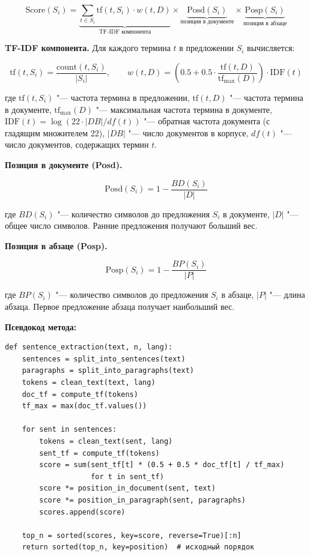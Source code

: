 \begin{equation}
	\text{Score}(S_i) = \underbrace{\sum_{t \in S_i} \text{tf}(t, S_i) \cdot w(t, D)}_{\text{TF-IDF компонента}} \times \underbrace{\text{Posd}(S_i)}_{\text{позиция в документе}} \times \underbrace{\text{Posp}(S_i)}_{\text{позиция в абзаце}}
	\label{eq:summary_score}
\end{equation}

\textbf{TF-IDF компонента.} Для каждого термина $t$ в предложении $S_i$ вычисляется:

\begin{equation}
	\text{tf}(t, S_i) = \frac{\text{count}(t, S_i)}{|S_i|},
	\qquad
	w(t, D) = \left(0.5 + 0.5 \cdot \frac{\text{tf}(t, D)}{\text{tf}_{\max}(D)}\right) \cdot \text{IDF}(t)
	\label{eq:summary_tf}
\end{equation}

где $\text{tf}(t, S_i)$ "--- частота термина в предложении, $\text{tf}(t, D)$ "--- частота
термина в документе, $\text{tf}_{\max}(D)$ "--- максимальная частота термина в документе,
$\text{IDF}(t) = \log(22 \cdot |DB| / df(t))$ "--- обратная частота документа
(с гладящим множителем 22), $|DB|$ "--- число документов в корпусе,
$df(t)$ "--- число документов, содержащих термин $t$.

\textbf{Позиция в документе (Posd).}

\begin{equation}
	\text{Posd}(S_i) = 1 - \frac{BD(S_i)}{|D|}
	\label{eq:posd}
\end{equation}

где $BD(S_i)$ "--- количество символов до предложения $S_i$ в документе, $|D|$ "--- общее число символов.
Ранние предложения получают больший вес.

\textbf{Позиция в абзаце (Posp).}

\begin{equation}
	\text{Posp}(S_i) = 1 - \frac{BP(S_i)}{|P|}
	\label{eq:posp}
\end{equation}

где $BP(S_i)$ "--- количество символов до предложения $S_i$ в абзаце, $|P|$ "--- длина абзаца.
Первое предложение абзаца получает наибольший вес.

\textbf{Псевдокод метода:}

\begin{lstlisting}[caption={Алгоритм Sentence Extraction.},label={lst:extraction_algo}]
def sentence_extraction(text, n, lang):
    sentences = split_into_sentences(text)
    paragraphs = split_into_paragraphs(text)
    tokens = clean_text(text, lang)
    doc_tf = compute_tf(tokens)
    tf_max = max(doc_tf.values())

    for sent in sentences:
        tokens = clean_text(sent, lang)
        sent_tf = compute_tf(tokens)
        score = sum(sent_tf[t] * (0.5 + 0.5 * doc_tf[t] / tf_max)
                    for t in sent_tf)
        score *= position_in_document(sent, text)
        score *= position_in_paragraph(sent, paragraphs)
        scores.append(score)

    top_n = sorted(scores, key=score, reverse=True)[:n]
    return sorted(top_n, key=position)  # исходный порядок
\end{lstlisting}

